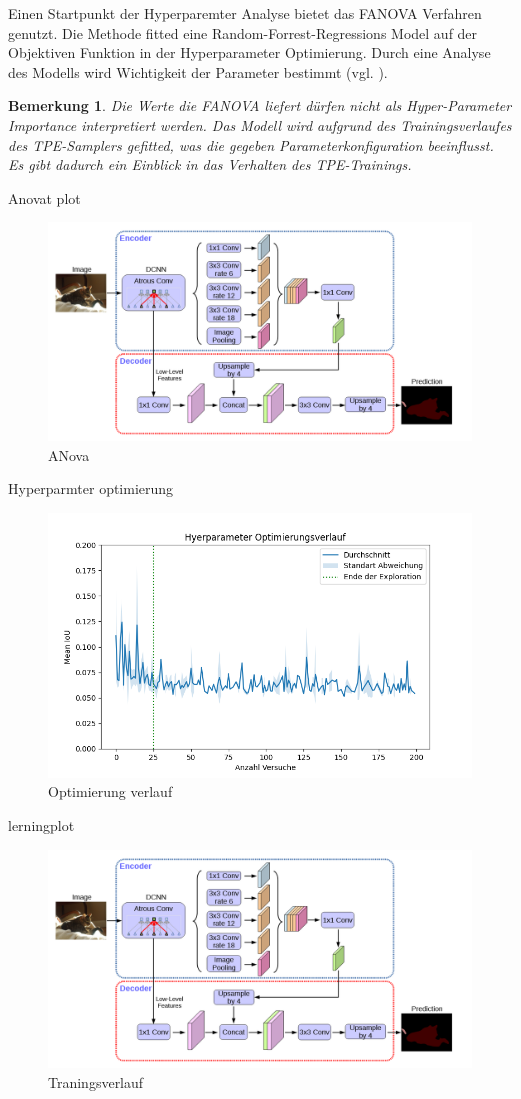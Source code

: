 \documentclass[12pt,DIV=15,BCOR=15mm,twoside,headsepline,abstract=true,listof=totoc,bibliography=totoc]{scrreprt}
\newtheorem{remark}{Bemerkung}[chapter]
\theoremstyle{remark}    %
\begin{document}
    Einen Startpunkt der Hyperparemter Analyse bietet das FANOVA Verfahren genutzt. Die Methode fitted eine Random-Forrest-Regressions Model auf der Objektiven Funktion in der
    Hyperparameter Optimierung. Durch eine Analyse des Modells wird Wichtigkeit der Parameter bestimmt 
    (vgl. \cite{akiba2019optunanextgenerationhyperparameteroptimization, pmlr-v32-hutter14}).
    \begin{remark}
    Die Werte die FANOVA liefert dürfen nicht als Hyper-Parameter Importance interpretiert werden. Das Modell wird aufgrund des Trainingsverlaufes des TPE-Samplers gefitted, was die 
    gegeben Parameterkonfiguration beeinflusst. Es gibt dadurch ein Einblick in das Verhalten des TPE-Trainings.
    \end{remark}
    Anovat plot
    \begin{figure}[ht]
        \centering
        \includegraphics[width=0.1\linewidth]{pics/Arc.png}
        \caption{ANova }
    \end{figure}

    Hyperparmter optimierung 
    \begin{figure}[ht]
        \centering
        \includegraphics[width=\linewidth]{pics/optimization.png}
        \caption{Optimierung verlauf}
    \end{figure}


    lerningplot 
    \begin{figure}[ht]
        \centering
        \includegraphics[width=0.1\linewidth]{pics/Arc.png}
        \caption{Traningsverlauf}
    \end{figure}
\end{document}
